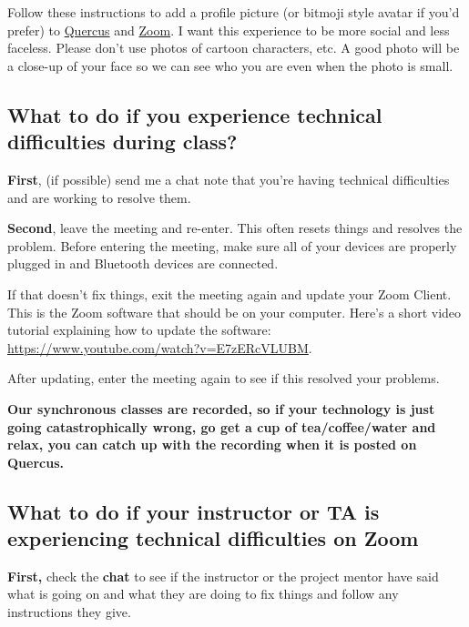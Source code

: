 \documentclass[
]{book}
\begin{document}
Follow these instructions to add a profile picture (or bitmoji style avatar if you'd prefer) to \href{https://community.canvaslms.com/docs/DOC-10599-4212710334}{Quercus} and \href{https://support.zoom.us/hc/en-us/articles/201363203-Customizing-your-profile}{Zoom}. I want this experience to be more social and less faceless. Please don't use photos of cartoon characters, etc. A good photo will be a close-up of your face so we can see who you are even when the photo is small.

\hypertarget{what-to-do-if-you-experience-technical-difficulties-during-class}{%
\subsection{What to do if you experience technical difficulties during class?}\label{what-to-do-if-you-experience-technical-difficulties-during-class}}

\textbf{First}, (if possible) send me a chat note that you're having technical difficulties and are working to resolve them.

\textbf{Second}, leave the meeting and re-enter. This often resets things and resolves the problem. Before entering the meeting, make sure all of your devices are properly plugged in and Bluetooth devices are connected.

If that doesn't fix things, exit the meeting again and update your Zoom Client. This is the Zoom software that should be on your computer. Here's a short video tutorial explaining how to update the software: \url{https://www.youtube.com/watch?v=E7zERcVLUBM}.

After updating, enter the meeting again to see if this resolved your problems.

\textbf{Our synchronous classes are recorded, so if your technology is just going catastrophically wrong, go get a cup of tea/coffee/water and relax, you can catch up with the recording when it is posted on Quercus.}

\hypertarget{what-to-do-if-your-instructor-or-ta-is-experiencing-technical-difficulties-on-zoom}{%
\subsection{What to do if your instructor or TA is experiencing technical difficulties on Zoom}\label{what-to-do-if-your-instructor-or-ta-is-experiencing-technical-difficulties-on-zoom}}

\textbf{First,} check the \textbf{chat} to see if the instructor or the project mentor have said what is going on and what they are doing to fix things and follow any instructions they give.
\end{document}
